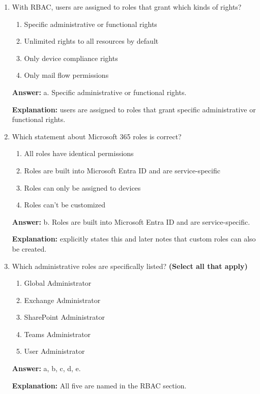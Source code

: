\documentclass[10pt]{article}
\begin{document}
\begin{enumerate}[leftmargin=*]
\textbf{Explanation:} The Role-based access control section says Microsoft 365 uses RBAC as a central mechanism for authorization.

\item With RBAC, users are assigned to roles that grant which kinds of rights?
\begin{enumerate}[label=\alph*., leftmargin=1.5em]
\item Specific administrative or functional rights
\item Unlimited rights to all resources by default
\item Only device compliance rights
\item Only mail flow permissions
\end{enumerate}
\textbf{Answer:} a. Specific administrative or functional rights.

\textbf{Explanation:} users are assigned to roles that grant specific administrative or functional rights.

\item Which statement about Microsoft 365 roles is correct?
\begin{enumerate}[label=\alph*., leftmargin=1.5em]
\item All roles have identical permissions
\item Roles are built into Microsoft Entra ID and are service-specific
\item Roles can only be assigned to devices
\item Roles can’t be customized
\end{enumerate}
\textbf{Answer:} b. Roles are built into Microsoft Entra ID and are service-specific.

\textbf{Explanation:} explicitly states this and later notes that custom roles can also be created.

\item Which administrative roles are specifically listed? \textbf{(Select all that apply)}
\begin{enumerate}[label=\alph*., leftmargin=1.5em]
\item Global Administrator
\item Exchange Administrator
\item SharePoint Administrator
\item Teams Administrator
\item User Administrator
\end{enumerate}
\textbf{Answer:} a, b, c, d, e.

\textbf{Explanation:} All five are named in the RBAC section.


\end{enumerate}
\end{document}
